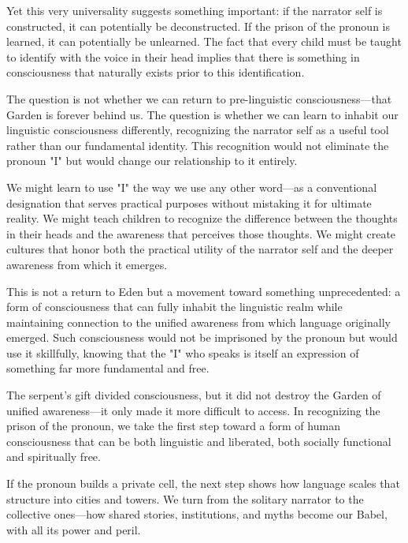 Yet this very universality suggests something important: if the narrator self is constructed, it can potentially be deconstructed. If the prison of the pronoun is learned, it can potentially be unlearned. The fact that every child must be taught to identify with the voice in their head implies that there is something in consciousness that naturally exists prior to this identification.

The question is not whether we can return to pre-linguistic consciousness—that Garden is forever behind us. The question is whether we can learn to inhabit our linguistic consciousness differently, recognizing the narrator self as a useful tool rather than our fundamental identity. This recognition would not eliminate the pronoun "I" but would change our relationship to it entirely.

We might learn to use "I" the way we use any other word—as a conventional designation that serves practical purposes without mistaking it for ultimate reality. We might teach children to recognize the difference between the thoughts in their heads and the awareness that perceives those thoughts. We might create cultures that honor both the practical utility of the narrator self and the deeper awareness from which it emerges.

This is not a return to Eden but a movement toward something unprecedented: a form of consciousness that can fully inhabit the linguistic realm while maintaining connection to the unified awareness from which language originally emerged. Such consciousness would not be imprisoned by the pronoun but would use it skillfully, knowing that the "I" who speaks is itself an expression of something far more fundamental and free.

The serpent's gift divided consciousness, but it did not destroy the Garden of unified awareness—it only made it more difficult to access. In recognizing the prison of the pronoun, we take the first step toward a form of human consciousness that can be both linguistic and liberated, both socially functional and spiritually free.

\bigskip
\noindent If the pronoun builds a private cell, the next step shows how language scales that structure into cities and towers. We turn from the solitary narrator to the collective ones—how shared stories, institutions, and myths become our Babel, with all its power and peril.
